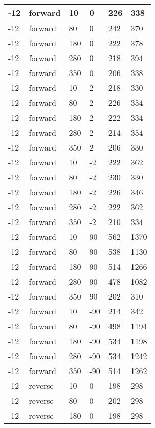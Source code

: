 \begin{table}
\begin{center}
\begin{tabular}{|l|l|l|l|l|l|}
			\hline
			-12 & forward & 10 & 0 & 226 & 338 \\
			\hline
			-12 & forward & 80 & 0 & 242 & 370 \\
			\hline
			-12 & forward & 180 & 0 & 222 & 378 \\
			\hline
			-12 & forward & 280 & 0 & 218 & 394 \\
			\hline
			-12 & forward & 350 & 0 & 206 & 338 \\
			\hline
			-12 & forward & 10 & 2 & 218 & 330 \\
			\hline
			-12 & forward & 80 & 2 & 226 & 354 \\
			\hline
			-12 & forward & 180 & 2 & 222 & 334 \\
			\hline
			-12 & forward & 280 & 2 & 214 & 354 \\
			\hline
			-12 & forward & 350 & 2 & 206 & 330 \\
			\hline
			-12 & forward & 10 & -2 & 222 & 362 \\
			\hline
			-12 & forward & 80 & -2 & 230 & 330 \\
			\hline
			-12 & forward & 180 & -2 & 226 & 346 \\
			\hline
			-12 & forward & 280 & -2 & 222 & 362 \\
			\hline
			-12 & forward & 350 & -2 & 210 & 334 \\
			\hline
			-12 & forward & 10 & 90 & 562 & 1370 \\
			\hline
			-12 & forward & 80 & 90 & 538 & 1130 \\
			\hline
			-12 & forward & 180 & 90 & 514 & 1266 \\
			\hline
			-12 & forward & 280 & 90 & 478 & 1082 \\
			\hline
			-12 & forward & 350 & 90 & 202 & 310 \\
			\hline
			-12 & forward & 10 & -90 & 214 & 342 \\
			\hline
			-12 & forward & 80 & -90 & 498 & 1194 \\
			\hline
			-12 & forward & 180 & -90 & 534 & 1198 \\
			\hline
			-12 & forward & 280 & -90 & 534 & 1242 \\
			\hline
			-12 & forward & 350 & -90 & 514 & 1262 \\
			\hline
			-12 & reverse & 10 & 0 & 198 & 298 \\
			\hline
			-12 & reverse & 80 & 0 & 202 & 298 \\
			\hline
			-12 & reverse & 180 & 0 & 198 & 298 \\
			\hline

\end{tabular}
\end{center}
\end{table}
